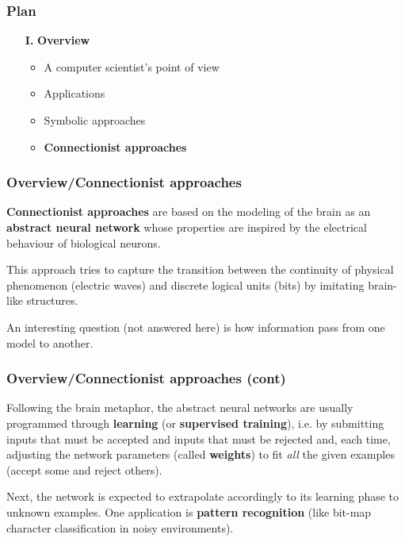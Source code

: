 %
\begin{frame}
\frametitle{Plan}

\begin{itemize}

  \item[\textbf{I.}] \textbf{Overview}

    \begin{itemize}

      \item A computer scientist's point of view

      \item Applications

      \item Symbolic approaches

      \item \textbf{Connectionist approaches}

    \end{itemize}

\end{itemize}

\end{frame}

%
\begin{frame}
\frametitle{Overview/Connectionist approaches}

\textbf{Connectionist approaches} are based on the modeling of the
brain as an \textbf{abstract neural network} whose properties are
inspired by the electrical behaviour of biological neurons. 

\bigskip

This approach tries to capture the transition between the continuity
of physical phenomenon (electric waves) and discrete logical units
(bits) by imitating brain-like structures. 

\bigskip

An interesting question (not answered here) is how information pass
from one model to another.

\end{frame}

%
\begin{frame}
\frametitle{Overview/Connectionist approaches (cont)}

Following the brain metaphor, the abstract neural networks are usually
programmed through \textbf{learning} (or \textbf{supervised
training}), i.e. by submitting inputs that must be accepted and inputs
that must be rejected and, each time, adjusting the network parameters
(called \textbf{weights}) to fit \emph{all} the given examples (accept
some and reject others).

\bigskip

Next, the network is expected to extrapolate accordingly to its
learning phase to unknown examples. One application is \textbf{pattern
recognition} (like bit-map character classification in noisy
environments).

\end{frame}
